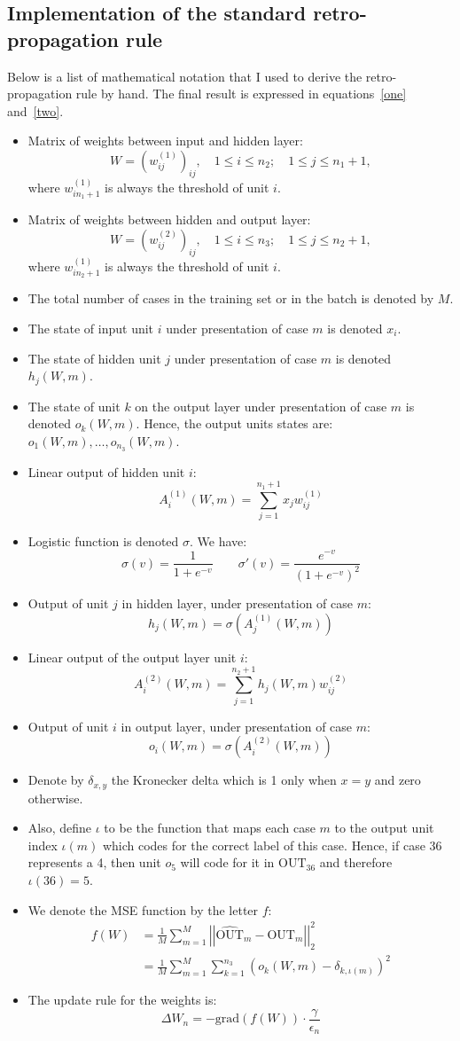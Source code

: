 \documentclass{article}
\newcommand{\lp}{\left(}
\newcommand{\rp}{\right)}
\begin{document}
\subsection{Implementation of the standard retro-propagation rule}
Below is a list of mathematical notation that I used to derive the retro-propagation rule by hand.
The final result is expressed in equations~\eqref{one} and~\eqref{two}.
\begin{itemize}
\item Matrix of weights between input and hidden layer:
\[
W=\left(w_{ij}^{(1)}\right)_{ij}, \quad 1\leq i\leq n_2; \quad1\leq j \leq n_1+1,
\]
where $w_{in_1+1}^{(1)}$ is always the threshold of unit $i$.
\item Matrix of weights between hidden and output layer:
\[
W=\left(w_{ij}^{(2)}\right)_{ij}, \quad 1\leq i\leq n_3; \quad1\leq j \leq n_2+1,
\]
where $w_{in_2+1}^{(1)}$ is always the threshold of unit $i$.
\item The total number of cases in the training set or in the batch is denoted by $M$.
\item The state of input unit $i$ under presentation of case $m$ is denoted $x_i$. 
\item The state of hidden unit $j$ under presentation of case $m$ is denoted $h_j(W,m)$.
\item The state of unit $k$ on the output layer under presentation of case $m$ is denoted $o_k(W,m)$.
Hence, the output units states are: $o_1(W,m),\ldots,o_{n_3}(W,m)$.
\item Linear output of hidden unit $i$:
\[
A_i^{(1)}(W,m)=\sum_{j=1}^{n_1+1}x_jw_{ij}^{(1)}
\]
\item Logistic function is denoted $\sigma$. We have:
\[
\sigma(v)=\frac{1}{1+e^{-v}}\qquad \sigma'(v)=\frac{e^{-v}}{\lp1+e^{-v}\rp^2}
\]
\item Output of unit $j$ in hidden layer, under presentation of case $m$:
\[
h_j(W,m)=\sigma\lp A_j^{(1)}(W,m) \rp
\]
\item Linear output of the output layer unit $i$:
\[
A_i^{(2)}(W,m)=\sum_{j=1}^{n_2+1}h_j(W,m)w_{ij}^{(2)}
\]
\item Output of unit $i$ in output layer, under presentation of case $m$:
\[
o_i(W,m)=\sigma\lp A_i^{(2)}(W,m) \rp
\]
\item Denote by $\delta_{x,y}$ the Kronecker delta which is 1 only when $x=y$ and zero otherwise.
\item Also, define $\iota$ to be the function that maps each case $m$ to the output unit index $\iota(m)$
which codes for the correct label of this case. Hence, if case 36 represents a 4, then unit $o_5$ will code
for it in $\text{OUT}_{36}$ and therefore $\iota(36)=5$.
\item We denote the MSE function by the letter $f$:
\begin{align}
f(W)&=\frac{1}{M}\sum_{m=1}^{M}\left |\left| \widehat{\text{OUT}}_m-\text{OUT}_m \right |\right |_2^2\\
	&=\frac{1}{M}\sum_{m=1}^M \sum_{k=1}^{n_3}\lp o_{k}(W,m)-\delta_{k,\iota(m)}\rp^2
\end{align}
\item The update rule for the weights is:
\[
\Delta W_n=-\text{grad} \lp f(W)\rp\cdot \frac{\gamma}{\epsilon_n}
\]
\end{itemize}
\end{document}
